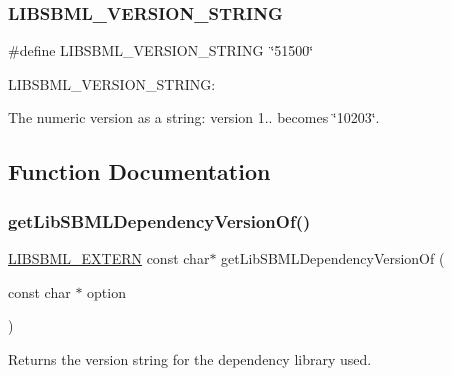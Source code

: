 \subsubsection{\texorpdfstring{L\+I\+B\+S\+B\+M\+L\+\_\+\+V\+E\+R\+S\+I\+O\+N\+\_\+\+S\+T\+R\+I\+NG}{LIBSBML\_VERSION\_STRING}}
{\footnotesize\ttfamily \#define L\+I\+B\+S\+B\+M\+L\+\_\+\+V\+E\+R\+S\+I\+O\+N\+\_\+\+S\+T\+R\+I\+NG~\char`\"{}51500\char`\"{}}

L\+I\+B\+S\+B\+M\+L\+\_\+\+V\+E\+R\+S\+I\+O\+N\+\_\+\+S\+T\+R\+I\+NG\+:

The numeric version as a string\+: version 1.. becomes \char`\"{}10203\char`\"{}. 

\subsection{Function Documentation}
\mbox{\label{libsbml-version_8h_ad8c08b0c3fba5e80304ada1deaedce2f}} 
\subsubsection{\texorpdfstring{get\+Lib\+S\+B\+M\+L\+Dependency\+Version\+Of()}{getLibSBMLDependencyVersionOf()}}
{\footnotesize\ttfamily \hyperlink{extern_8h_a8e9e5118f0c55d410f8bc217f2954dbf}{L\+I\+B\+S\+B\+M\+L\+\_\+\+E\+X\+T\+E\+RN} const char$\ast$ get\+Lib\+S\+B\+M\+L\+Dependency\+Version\+Of (\begin{DoxyParamCaption}\item[{const char $\ast$}]{option }\end{DoxyParamCaption})}

Returns the version string for the dependency library used.


